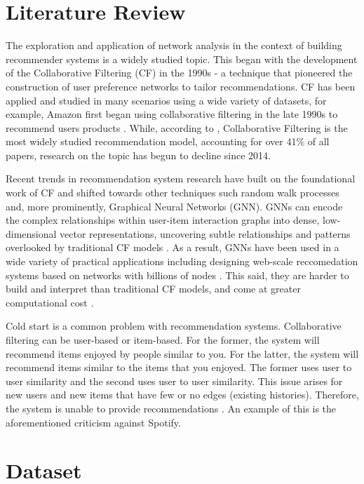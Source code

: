 \documentclass[12pt]{article}
\numberwithin{equation}{section}
\begin{document}
\section{Literature Review}

The exploration and application of network analysis in the context of building recommender systems is a widely studied topic. This began with the development of the Collaborative Filtering (CF) in the 1990s - a technique that pioneered the construction of user preference networks to tailor recommendations. CF has been applied and studied in many scenarios using a wide variety of datasets, for example, Amazon first began using collaborative filtering in the late 1990s to recommend users products \cite{collab_f}. While, according to \cite{survey_reccomendation}, Collaborative Filtering is the most widely studied recommendation model, accounting for over 41\% of all papers, research on the topic has begun to decline since 2014.

Recent trends in recommendation system research have built on the foundational work of CF and shifted towards other techniques such random walk processes \cite{prob_s} and, more prominently, Graphical Neural Networks (GNN). GNNs can encode the complex relationships within user-item interaction graphs into dense, low-dimensional vector representations,  uncovering subtle relationships and patterns overlooked by traditional CF models . As a result, GNNs have been used in a wide variety of practical applications including designing web-scale reccomedation systems based on networks with billions of nodes \cite{GNNwebscale}. This said, they are harder to build and interpret than traditional CF models, and come at greater computational cost \cite{collab_f}. 

Cold start is a common problem with recommendation systems. Collaborative filtering can be user-based or item-based. For the former, the system will recommend items enjoyed by people similar to you. For the latter, the system will recommend items similar to the items that you enjoyed. The former uses user to user similarity and the second uses user to user similarity. This issue arises for new users and new items that have few or no edges (existing histories). Therefore, the system is unable to provide recommendations \cite{cold_start}.  An example of this is the aforementioned criticism against Spotify.


\section{Dataset}
\end{document}
